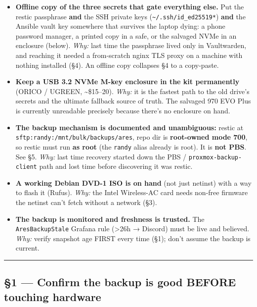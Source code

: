 \documentclass[
]{article}
\providecommand{\tightlist}{%
  \setlength{\itemsep}{0pt}\setlength{\parskip}{0pt}}
\begin{document}
\begin{itemize}
\tightlist
\item[$\square$]
  \textbf{Offline copy of the three secrets that gate everything else.}
  Put the restic passphrase \textbf{and} the SSH private keys
  (\texttt{\textasciitilde{}/.ssh/id\_ed25519*}) \textbf{and} the
  Ansible vault key somewhere that survives the laptop dying: a phone
  password manager, a printed copy in a safe, or the salvaged NVMe in an
  enclosure (below). \emph{Why:} last time the passphrase lived only in
  Vaultwarden, and reaching it needed a from-scratch nginx TLS proxy on
  a machine with nothing installed (§4). An offline copy collapses §4 to
  a copy-paste.
\item[$\square$]
  \textbf{Keep a USB 3.2 NVMe M-key enclosure in the kit permanently}
  (ORICO / UGREEN, \textasciitilde\$15--20). \emph{Why:} it is the
  fastest path to the old drive's secrets and the ultimate fallback
  source of truth. The salvaged 970 EVO Plus is currently unreadable
  precisely because there's no enclosure on hand.
\item[$\square$]
  \textbf{The backup mechanism is documented and unambiguous:} restic at
  \texttt{sftp:randy:/mnt/bulk/backups/ares}, repo dir is
  \textbf{root-owned mode 700}, so restic must run \textbf{as root} (the
  \texttt{randy} alias already is root). It is \textbf{not PBS}. See §5.
  \emph{Why:} last time recovery started down the PBS /
  \texttt{proxmox-backup-client} path and lost time before discovering
  it was restic.
\item[$\square$]
  \textbf{A working Debian DVD-1 ISO is on hand} (not just netinst) with
  a way to flash it (Rufus). \emph{Why:} the Intel Wireless-AC card
  needs non-free firmware the netinst can't fetch without a network
  (§3).
\item[$\square$]
  \textbf{The backup is monitored and freshness is trusted.} The
  \texttt{AresBackupStale} Grafana rule (\textgreater26h → Discord) must
  be live and believed. \emph{Why:} verify snapshot age FIRST every time
  (§1); don't assume the backup is current.
\end{itemize}

\begin{center}\rule{0.5\linewidth}{0.5pt}\end{center}

\hypertarget{confirm-the-backup-is-good-before-touching-hardware}{%
\subsection{§1 --- Confirm the backup is good BEFORE touching
hardware}\label{confirm-the-backup-is-good-before-touching-hardware}}
\end{document}
